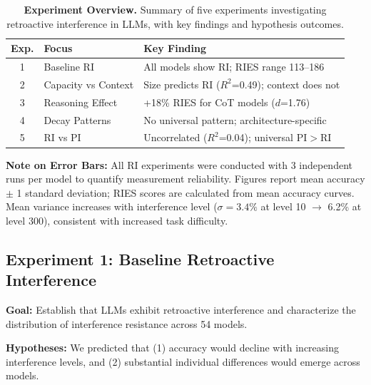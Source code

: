\documentclass{article}
\begin{document}
\begin{table}[t]
\centering
\small
\caption{\textbf{Experiment Overview.} Summary of five experiments investigating retroactive interference in LLMs, with key findings and hypothesis outcomes.}
\label{tab:experiment_overview}
\setlength{\tabcolsep}{3pt}
\begin{tabular}{@{}clp{4.2cm}@{}}
\toprule
\textbf{Exp.} & \textbf{Focus} & \textbf{Key Finding} \\
\midrule
1 & Baseline RI & All models show RI; RIES range 113--186 \\
2 & Capacity vs Context & Size predicts RI ($R^2$=0.49); context does not \\
3 & Reasoning Effect & +18\% RIES for CoT models ($d$=1.76) \\
4 & Decay Patterns & No universal pattern; architecture-specific \\
5 & RI vs PI & Uncorrelated ($R^2$=0.04); universal PI$>$RI \\
\bottomrule
\end{tabular}
\end{table}

\textbf{Note on Error Bars:} All RI experiments were conducted with 3 independent runs per model to quantify measurement reliability. Figures report mean accuracy $\pm$ 1 standard deviation; RIES scores are calculated from mean accuracy curves. Mean variance increases with interference level ($\sigma = 3.4\%$ at level 10 $\rightarrow$ 6.2\% at level 300), consistent with increased task difficulty.

\subsection{Experiment 1: Baseline Retroactive Interference}
\label{exp:baseline}

\textbf{Goal:} Establish that LLMs exhibit retroactive interference and characterize the distribution of interference resistance across 54 models.

\textbf{Hypotheses:} We predicted that (1) accuracy would decline with increasing interference levels, and (2) substantial individual differences would emerge across models.
\end{document}

